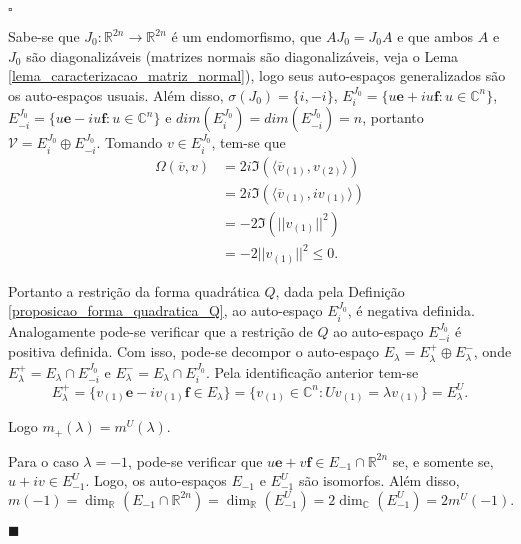 \documentclass[12pt]{book}
\newenvironment{prova}[1]{$\square$ #1}{\hfill$\blacksquare$}
\newcommand{\autoespaco}[1]{E_{#1}}
\newcommand{\complexificado}[1]{\mathcal{#1}}
\newcommand{\complexo}[1]{\mathbb{C}^{#1}}
\newcommand{\espectrooperador}[1]{\sigma(#1)}
\newcommand{\estruturacomplexa}{J_{0}}
\newcommand{\formaSimpleticaExtendida}[2]{\Omega(#1, #2)}
\newcommand{\norma}[1]{||#1||}
\newcommand{\parteImaginaria}[1]{\Im(#1)}
\newcommand{\produtointerno}[2]{\langle #1, #2 \rangle}
\newcommand{\real}[1]{\mathbb{R}^{#1}}
\newcommand{\reta}{\real{}}
\begin{document}
\begin{prova}
\begin{enumerate}
			Sabe-se que $\estruturacomplexa: \real{2n} \to \real{2n}$ é um endomorfismo, que $A\estruturacomplexa = \estruturacomplexa A$ e que ambos $A$ e $\estruturacomplexa$ são diagonalizáveis (matrizes normais são diagonalizáveis, veja o Lema \ref{lema_caracterizacao_matriz_normal}), logo seus auto-espaços generalizados são os auto-espaços usuais. Além disso, $\espectrooperador{\estruturacomplexa} = \{i,-i\}$, $\autoespaco{i}^{\estruturacomplexa} = \{u\textbf{e} +iu\textbf{f}: u \in \complexo{n}\}$, $\autoespaco{ -i}^{\estruturacomplexa} = \{u\textbf{e} -iu\textbf{f}: u \in \complexo{n}\}$ e $dim(\autoespaco{i}^{\estruturacomplexa} )=dim(\autoespaco{-i}^{\estruturacomplexa} )=n$, portanto $\complexificado{V} = \autoespaco{i}^{\estruturacomplexa}\oplus \autoespaco{-i}^{\estruturacomplexa}$. 
			Tomando $v \in \autoespaco{i}^{\estruturacomplexa}$, tem-se que 
			$$
			\begin{aligned}
				\formaSimpleticaExtendida{\overline{v}}{v} 
				&= 2i\parteImaginaria{\produtointerno{\overline{v}_{(1)}}{v_{(2)}}}
				\\
				&= 2i\parteImaginaria{\produtointerno{\overline{v}_{(1)}}{iv_{(1)}}}
				\\
				&=-2\parteImaginaria{\norma{v_{(1)}}^{2}}
				\\
				&=-2\norma{v_{(1)}}^{2} \leq 0.
			\end{aligned}
			$$
			
			Portanto a restrição da forma quadrática $Q$, dada pela Definição \ref{proposicao_forma_quadratica_Q}, ao auto-espaço $\autoespaco{ i}^{\estruturacomplexa}$, é negativa definida. Analogamente pode-se verificar que a restrição de $Q$ ao auto-espaço $\autoespaco{ -i}^{\estruturacomplexa}$ é positiva definida. Com isso, pode-se decompor o auto-espaço $\autoespaco{\lambda} = \autoespaco{\lambda}^{+} \oplus \autoespaco{\lambda}^{-}$, onde $\autoespaco{\lambda}^{+} = \autoespaco{\lambda}\cap \autoespaco{- i}^{\estruturacomplexa} $ e $\autoespaco{\lambda}^{-} = \autoespaco{\lambda}\cap \autoespaco{ i}^{\estruturacomplexa} $. Pela identificação anterior tem-se
			$$
			\autoespaco{\lambda}^{+}=\{v_{(1)}\textbf{e}-iv_{(1)}\textbf{f}\in \autoespaco{\lambda}\} = \{v_{(1)} \in \complexo{n} : Uv_{(1)}=\lambda v_{(1)} \} = \autoespaco{\lambda}^{U}.
			$$
			
			Logo $m_{+}(\lambda) = m^{U}(\lambda)$.
			
			Para o caso $\lambda=-1$, pode-se verificar que $u\textbf{e}+v\textbf{f} \in \autoespaco{-1}\cap \real{2n}$ se, e somente se, $u+iv \in \autoespaco{-1}^{U}$. Logo, os auto-espaços $\autoespaco{-1}$ e $\autoespaco{-1}^{U}$ são isomorfos. Além disso, 
			$$
			m(-1) = \dim_{\reta}(\autoespaco{-1}\cap \real{2n}) = \dim_{\reta}(\autoespaco{-1}^{U}) = 2\dim_{\complexo{}}(\autoespaco{-1}^{U}) =2m^{U}(-1).
			$$
			

\end{enumerate}
\end{prova}
\end{document}
